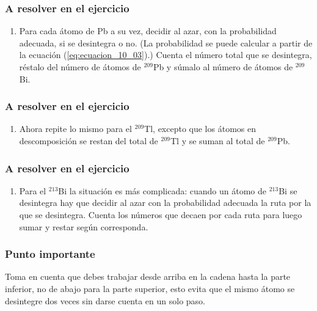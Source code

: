 \documentclass[12pt]{beamer}
\begin{document}
\begin{frame}
\frametitle{A resolver en el ejercicio}
\begin{enumerate}[<+->]
\item Para cada átomo de Pb a su vez, decidir al azar, con la probabilidad adecuada, si se desintegra o no. (La probabilidad se puede calcular a partir de la ecuación (\ref{eq:ecuacion_10_03}).) Cuenta el número total que se desintegra, réstalo del número de átomos de ${}^{209}$Pb y súmalo al número de átomos de ${}^{209}$Bi.
\seti
\end{enumerate}
\end{frame}
\begin{frame}
\frametitle{A resolver en el ejercicio}
\begin{enumerate}[<+->]
\conti
\item Ahora repite lo mismo para el ${}^{209}$Tl, excepto que los átomos en descomposición se restan del total de ${}^{209}$Tl y se suman al total de ${}^{209}$Pb.
\seti
\end{enumerate}
\end{frame}
\begin{frame}
\frametitle{A resolver en el ejercicio}
\begin{enumerate}[<+->]
\conti
\item Para el ${}^{213}$Bi la situación es más complicada: cuando un átomo de ${}^{213}$Bi se desintegra hay que decidir al azar con la probabilidad adecuada la ruta por la que se desintegra. Cuenta los números que decaen por cada ruta para luego sumar y restar según corresponda.
\seti
\end{enumerate}
\end{frame}
\begin{frame}
\frametitle{Punto importante}
Toma en cuenta que debes trabajar desde arriba en la cadena hasta la parte inferior, no de abajo para la parte superior, esto evita que el mismo átomo se desintegre dos veces sin darse cuenta en un solo paso.
\end{frame}
\end{document}
